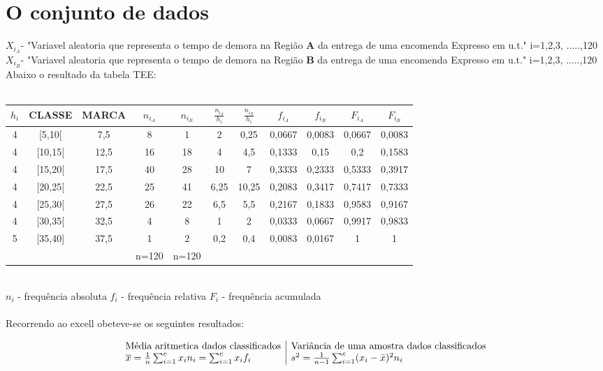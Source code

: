 \section{O conjunto de dados}\label{dados}
\noindent
$X_{i_A}$- "Variavel aleatoria que representa o tempo de demora na Região \textbf{A} da entrega de uma encomenda Expresso em u.t." \quad i=1,2,3, .....,120 \\
$X_{i_B}$- "Variavel aleatoria que representa o tempo de demora na Região \textbf{B} da entrega de uma encomenda Expresso em u.t." \quad i=1,2,3, .....,120 \\
Abaixo o resultado da tabela TEE:\\
\\
\begin{minipage}{0pt}
\begin{tabular}{ |c|c|c|c|c|c|c|c|c|c|c| }
\hline
$h_i$ & CLASSE & MARCA & $n_{i_A}$ & $n_{i_B}$ & $\frac{n_{i_A}}{h_i}$ & $\frac{n_{i_B}}{h_i}$ & $f_{i_A}$	& $f_{i_B}$ & $F_{i_A}$ & $F_{i_B}$ \\
\hline
4 & [5,10[ & 7,5 & 8 & 1 & 2 & 0,25 & 0,0667 & 0,0083 & 0,0667 & 0,0083 \\
\hline
4 & [10,15[ & 12,5 & 16 & 18 & 4 & 4,5 & 0,1333 & 0,15 & 0,2 & 0,1583 \\
\hline
4 & [15,20[ & 17,5 & 40 & 28 & 10 & 7 & 0,3333 & 0,2333 & 0,5333 & 0,3917 \\
\hline
4 & [20,25[ & 22,5 & 25 & 41 & 6,25 & 10,25 & 0,2083 & 0,3417 & 0,7417 & 0,7333 \\
\hline
4 & [25,30[ & 27,5 & 26 & 22 & 6,5 & 5,5 & 0,2167 & 0,1833 & 0,9583 & 0,9167 \\
\hline
4 & [30,35[ & 32,5 & 4 & 8 & 1 & 2 & 0,0333 & 0,0667 & 0,9917 & 0,9833 \\
\hline
5 & [35,40] & 37,5 & 1 & 2 & 0,2 & 0,4 & 0,0083 & 0,0167 & 1 & 1 \\
\hline
& & & n=120 & n=120 & & & & & & \\
\hline
\end{tabular}
\end{minipage}
\\
$n_i$ - frequência absoluta
$f_i$ - frequência relativa
$F_i$ - frequência acumulada
\\
\\
Recorrendo ao excell obeteve-se os seguintes resultados: \\
\begin{minipage}{0pt}
$$\begin{array}{l | l}
\text{Média aritmetica dados classificados} & \text{Variância de uma amostra dados classificados} \\
\overline{x} = \frac{1}{n}\sum_{i=1}^cx_in_i = \sum_{i=1}^cx_if_i & s^2 = \frac{1}{n-1}\sum_{i=1}^c (x_i-\bar{x})^2 n_i
\end{array}$$
\end{minipage}
